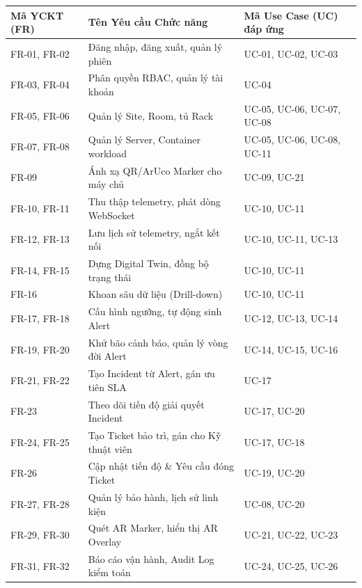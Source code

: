 \begin{longtable}{|p{2.5cm}|p{7.5cm}|p{4.5cm}|}
\hline
\textbf{Mã YCKT (FR)} & \textbf{Tên Yêu cầu Chức năng} & \textbf{Mã Use Case (UC) đáp ứng} \\ \hline
\endhead
FR-01, FR-02 & Đăng nhập, đăng xuất, quản lý phiên & UC-01, UC-02, UC-03 \\ \hline
FR-03, FR-04 & Phân quyền RBAC, quản lý tài khoản & UC-04 \\ \hline
FR-05, FR-06 & Quản lý Site, Room, tủ Rack & UC-05, UC-06, UC-07, UC-08 \\ \hline
FR-07, FR-08 & Quản lý Server, Container workload & UC-05, UC-06, UC-08, UC-11 \\ \hline
FR-09 & Ánh xạ QR/ArUco Marker cho máy chủ & UC-09, UC-21 \\ \hline
FR-10, FR-11 & Thu thập telemetry, phát dòng WebSocket & UC-10, UC-11 \\ \hline
FR-12, FR-13 & Lưu lịch sử telemetry, ngắt kết nối & UC-10, UC-11, UC-13 \\ \hline
FR-14, FR-15 & Dựng Digital Twin, đồng bộ trạng thái & UC-10, UC-11 \\ \hline
FR-16 & Khoan sâu dữ liệu (Drill-down) & UC-10, UC-11 \\ \hline
FR-17, FR-18 & Cấu hình ngưỡng, tự động sinh Alert & UC-12, UC-13, UC-14 \\ \hline
FR-19, FR-20 & Khử bão cảnh báo, quản lý vòng đời Alert & UC-14, UC-15, UC-16 \\ \hline
FR-21, FR-22 & Tạo Incident từ Alert, gán ưu tiên SLA & UC-17 \\ \hline
FR-23 & Theo dõi tiến độ giải quyết Incident & UC-17, UC-20 \\ \hline
FR-24, FR-25 & Tạo Ticket bảo trì, gán cho Kỹ thuật viên & UC-17, UC-18 \\ \hline
FR-26 & Cập nhật tiến độ \& Yêu cầu đóng Ticket & UC-19, UC-20 \\ \hline
FR-27, FR-28 & Quản lý bảo hành, lịch sử linh kiện & UC-08, UC-20 \\ \hline
FR-29, FR-30 & Quét AR Marker, hiển thị AR Overlay & UC-21, UC-22, UC-23 \\ \hline
FR-31, FR-32 & Báo cáo vận hành, Audit Log kiểm toán & UC-24, UC-25, UC-26 \\ \hline
\end{longtable}

